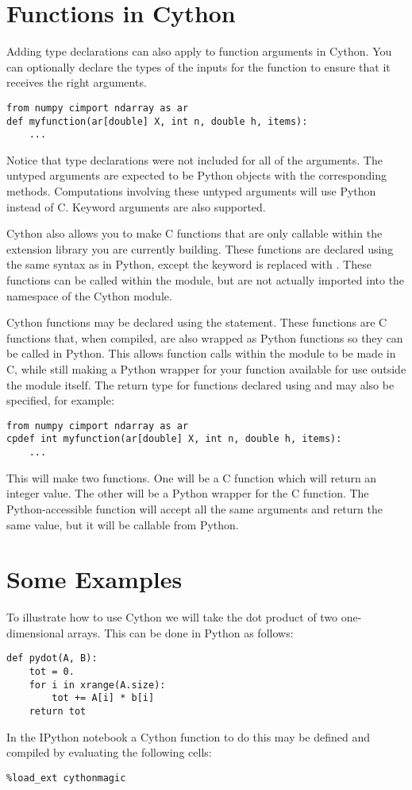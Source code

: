 \section*{Functions in Cython}
Adding type declarations can also apply to function arguments in Cython.
You can optionally declare the types of the inputs for the function to ensure that it receives the right arguments.
\begin{lstlisting}
from numpy cimport ndarray as ar
def myfunction(ar[double] X, int n, double h, items):
    ...
\end{lstlisting}
Notice that type declarations were not included for all of the arguments.
The untyped arguments are expected to be Python objects with the corresponding methods.
Computations involving these untyped arguments will use Python instead of C.
Keyword arguments are also supported.

Cython also allows you to make C functions that are only callable within the extension library you are currently building.
These functions are declared using the same syntax as in Python, except the keyword  is replaced with .
These functions can be called within the module, but are not actually imported into the namespace of the Cython module.

Cython functions may be declared using the  statement.
These functions are C functions that, when compiled, are also wrapped as Python functions so they can be called in Python.
This allows function calls within the module to be made in C, while still making a Python wrapper for your function available for use outside the module itself.
The return type for functions declared using  and  may also be specified, for example:
\begin{lstlisting}
from numpy cimport ndarray as ar
cpdef int myfunction(ar[double] X, int n, double h, items):
    ...
\end{lstlisting}
This will make two functions. 
One will be a C function which will return an integer value.
The other will be a Python wrapper for the C function.
The Python-accessible function will accept all the same arguments and return the same value, but it will be callable from Python.

\section*{Some Examples}
To illustrate how to use Cython we will take the dot product of two one-dimensional arrays.
This can be done in Python as follows:
\begin{lstlisting}
def pydot(A, B):
    tot = 0.
    for i in xrange(A.size):
        tot += A[i] * b[i]
    return tot
\end{lstlisting}
In the IPython notebook a Cython function to do this may be defined and compiled by evaluating the following cells:
\begin{lstlisting}
%load_ext cythonmagic
\end{lstlisting}

